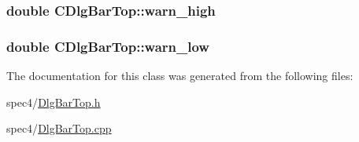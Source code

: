 \label{classCDlgBarTop_aa7d6c3b4e42e89d0224e0c9443410b75}
\hypertarget{classCDlgBarTop_af80330c5513f5d9e1fbaa6a85657091e}{
\subsubsection[{warn\_\-high}]{\setlength{\rightskip}{0pt plus 5cm}double {\bf CDlgBarTop::warn\_\-high}}}
\label{classCDlgBarTop_af80330c5513f5d9e1fbaa6a85657091e}
\hypertarget{classCDlgBarTop_a44955d59681e44e2d28eb2e5cb9001b8}{
\subsubsection[{warn\_\-low}]{\setlength{\rightskip}{0pt plus 5cm}double {\bf CDlgBarTop::warn\_\-low}}}
\label{classCDlgBarTop_a44955d59681e44e2d28eb2e5cb9001b8}


The documentation for this class was generated from the following files:\begin{DoxyCompactItemize}
\item 
spec4/\hyperlink{DlgBarTop_8h}{DlgBarTop.h}\item 
spec4/\hyperlink{DlgBarTop_8cpp}{DlgBarTop.cpp}\end{DoxyCompactItemize}
